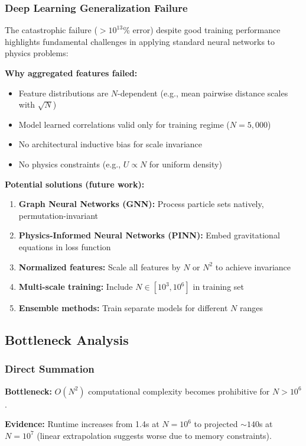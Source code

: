 \documentclass[11pt,a4paper]{article}
\begin{document}
\subsubsection{Deep Learning Generalization Failure}

The catastrophic failure ($>10^{13}$\% error) despite good training performance highlights fundamental challenges in applying standard neural networks to physics problems:

\textbf{Why aggregated features failed:}
\begin{itemize}
\item Feature distributions are $N$-dependent (e.g., mean pairwise distance scales with $\sqrt{N}$)
\item Model learned correlations valid only for training regime ($N=5{,}000$)
\item No architectural inductive bias for scale invariance
\item No physics constraints (e.g., $U \propto N$ for uniform density)
\end{itemize}

\textbf{Potential solutions (future work):}
\begin{enumerate}
\item \textbf{Graph Neural Networks (GNN):} Process particle sets natively, permutation-invariant
\item \textbf{Physics-Informed Neural Networks (PINN):} Embed gravitational equations in loss function
\item \textbf{Normalized features:} Scale all features by $N$ or $N^2$ to achieve invariance
\item \textbf{Multi-scale training:} Include $N \in [10^3, 10^6]$ in training set
\item \textbf{Ensemble methods:} Train separate models for different $N$ ranges
\end{enumerate}

\subsection{Bottleneck Analysis}

\subsubsection{Direct Summation}

\textbf{Bottleneck:} $O(N^2)$ computational complexity becomes prohibitive for $N > 10^6$.

\textbf{Evidence:} Runtime increases from 1.4s at $N=10^6$ to projected $\sim140$s at $N=10^7$ (linear extrapolation suggests worse due to memory constraints).
\end{document}
